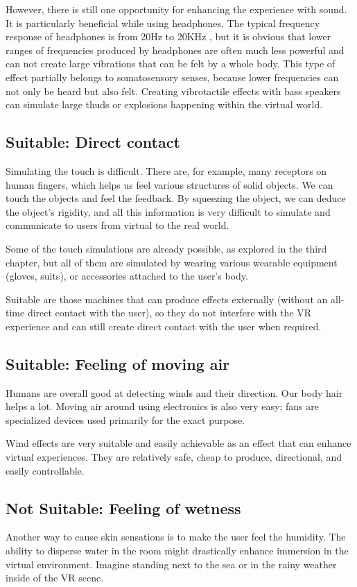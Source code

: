 However, there is still one opportunity for enhancing the experience with sound.
It is particularly beneficial while using headphones. The typical frequency
response of headphones is from 20Hz to 20KHz \cite{freqresp}, but it is obvious
that lower ranges of frequencies produced by headphones are often much
less powerful and can not create large vibrations that can be felt by a whole
body. This type of effect partially belongs to somatosensory senses, because
lower frequencies can not only be heard but also felt. Creating vibrotactile
effects with bass speakers can simulate large thuds or explosions
happening within the virtual world.

\subsection{Suitable: Direct contact}

Simulating the touch is difficult. There are, for example, many receptors on
human fingers, which helps us feel various structures of solid
objects. We can touch the objects and feel the feedback. By squeezing the
object, we can deduce the object’s rigidity, and all this
information is very difficult to simulate and communicate to users from
virtual to the real world.

Some of the touch simulations are already possible, as explored in the third chapter, but all
of them are simulated by wearing various wearable equipment (gloves, suits),
or accessories attached to the user’s body.

Suitable are those machines that can produce effects externally (without an
all-time direct contact with the user), so they do not interfere with the VR
experience and can still create direct contact with the user when required.


\hypertarget{x-suitable:-feeling-of-moving-air}{\subsection{Suitable: Feeling of moving air}}
Humans are overall good at detecting winds and their direction. Our body hair
helps a lot. Moving air around using electronics is also very easy; fans
are specialized devices used primarily for the exact purpose.


Wind effects are very suitable and easily achievable as an effect that can
enhance virtual experiences. They are relatively safe, cheap to produce,
directional, and easily controllable.


\hypertarget{x-not-suitable:-feeling-of-wetness}{\subsection{Not Suitable: Feeling of wetness}}
Another way to cause skin sensations is to make the user feel the humidity.
The ability to disperse water in the room might drastically enhance immersion
in the virtual environment. Imagine standing next to the sea or in the rainy weather
inside of the VR scene.

